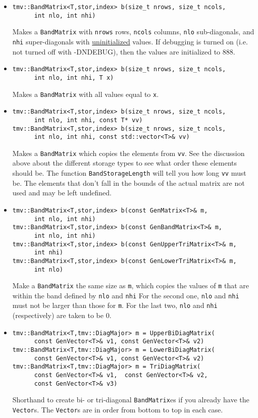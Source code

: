 \documentclass[twoside,letterpaper,11pt]{article}
\renewcommand{\tt}[1]{{\texttt {#1}}}
\begin{document}
\begin{itemize}
\item 
\begin{verbatim}
tmv::BandMatrix<T,stor,index> b(size_t nrows, size_t ncols, 
      int nlo, int nhi)
\end{verbatim}
Makes a \tt{BandMatrix} with \tt{nrows} rows, \tt{ncols} columns, 
\tt{nlo} sub-diagonals,
and \tt{nhi} super-diagonals with \underline{uninitialized} values.
If debugging is turned on (i.e. not turned off 
with -DNDEBUG), then the values are initialized to 888.

\item
\begin{verbatim}
tmv::BandMatrix<T,stor,index> b(size_t nrows, size_t ncols, 
      int nlo, int nhi, T x)
\end{verbatim}
Makes a \tt{BandMatrix} with all values equal to \tt{x}.

\item
\begin{verbatim}
tmv::BandMatrix<T,stor,index> b(size_t nrows, size_t ncols, 
      int nlo, int nhi, const T* vv)
tmv::BandMatrix<T,stor,index> b(size_t nrows, size_t ncols, 
      int nlo, int nhi, const std::vector<T>& vv)
\end{verbatim}
Makes a \tt{BandMatrix} which copies the elements from \tt{vv}.  See the 
discussion above about the different storage types to see what order these elements
should be.  The function \tt{BandStorageLength} will tell you how
long \tt{vv} must be.  The elements that don't fall in the bounds of the 
actual matrix are not used and may be left undefined.

\item 
\begin{verbatim}
tmv::BandMatrix<T,stor,index> b(const GenMatrix<T>& m, 
      int nlo, int nhi)
tmv::BandMatrix<T,stor,index> b(const GenBandMatrix<T>& m, 
      int nlo, int nhi)
tmv::BandMatrix<T,stor,index> b(const GenUpperTriMatrix<T>& m,
      int nhi)
tmv::BandMatrix<T,stor,index> b(const GenLowerTriMatrix<T>& m,
      int nlo)
\end{verbatim}
Make a \tt{BandMatrix} the same size as \tt{m}, which copies the values of \tt{m}
that are within the band defined by \tt{nlo} and \tt{nhi}
For the second one, \tt{nlo} and \tt{nhi} must not be larger than those for \tt{m}.
For the last two, \tt{nlo} and \tt{nhi} (respectively) are taken to be $0$.

\item
\begin{verbatim}
tmv::BandMatrix<T,tmv::DiagMajor> m = UpperBiDiagMatrix(
      const GenVector<T>& v1, const GenVector<T>& v2)
tmv::BandMatrix<T,tmv::DiagMajor> m = LowerBiDiagMatrix(
      const GenVector<T>& v1, const GenVector<T>& v2)
tmv::BandMatrix<T,tmv::DiagMajor> m = TriDiagMatrix(
      const GenVector<T>& v1,  const GenVector<T>& v2, 
      const GenVector<T>& v3)
\end{verbatim}
Shorthand to create bi- or tri-diagonal \tt{BandMatrix}es if you already have the 
\tt{Vector}s.  The \tt{Vector}s are in order from bottom to top in each case.


\end{itemize}
\end{document}
